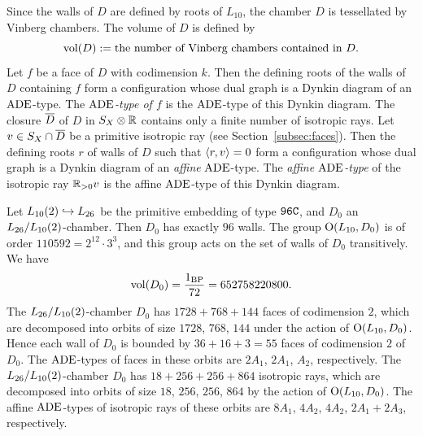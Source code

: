 \documentclass{amsart}
\numberwithin{procedure}{section}
\begin{document}
Since the walls of $D$ are defined by  roots of $L_{10}$, 
the chamber $D$ is tessellated by Vinberg chambers.
The volume of $D$ is defined by
\[
\mathord{\rm{vol}}(D):=\textrm{the number of Vinberg chambers contained in $D$}.
\]
Let $f$ be a face of $D$ with codimension $k$.
Then the defining roots of the walls of $D$ containing $f$
form a configuration whose dual graph is a Dynkin diagram
of an $\mathord{\rm ADE}$-type.
The \emph{$\mathord{\rm ADE}$-type of $f$} is the $\mathord{\rm ADE}$-type of this Dynkin diagram.
The closure $\overline{D}$ of $D$ in $S_{X}\otimes\mathord{\mathbb R}$ 
contains only a finite number of isotropic rays.
Let $v\in S_{X}\cap \overline{D}$ be a primitive isotropic ray (see Section~\ref{subsec:faces}).
Then the defining roots $r$ of walls of $D$
such that $\langle r, v \rangle=0$
form a configuration whose dual graph is a Dynkin diagram
of an \emph{affine} $\mathord{\rm ADE}$-type.
The \emph{affine $\mathord{\rm ADE}$-type} of the  isotropic ray $\mathord{\mathbb R}_{>0}v$ is
the affine $\mathord{\rm ADE}$-type of this Dynkin diagram.
%
\begin{example}\label{example:96C}
Let $L_{10}(2) \hookrightarrow L_{26}$ be the primitive embedding of type ${\tt 96C}$,
and  $D_0$  an $L_{26}/L_{10}(2)$-chamber.
Then $D_0$ has exactly $96$ walls.
The group $\mathord{\mathrm{O}}(L_{10}, D_0)$ is 
of order $110592=2^{12}\cdot 3^3$, and
this group acts on the set of walls of $D_0$ transitively.
We have
\[
\mathord{\rm{vol}}(D_0)=\frac{1_{\mathord{\rm{BP}}}}{72}=652758220800.
\]
The $L_{26}/L_{10}(2)$-chamber  $D_0$ has $1728+768+144$ faces of codimension $2$,
which are decomposed into orbits of size $1728$, $768$, $144$
under the action of $\mathord{\mathrm{O}}(L_{10}, D_0)$.
Hence each wall of $D_0$
is bounded by $36+16+3=55$ faces of codimension $2$ of $D_0$.
The $\mathord{\rm ADE}$-types of faces in these orbits are 
$2A_1$, $2A_1$, $A_2$, 
respectively.
The $L_{26}/L_{10}(2)$-chamber  $D_0$ has $18+256+256+864$  isotropic rays,
which are decomposed into orbits of size $18$, $256$, $256$, $864$
by the action of $\mathord{\mathrm{O}}(L_{10}, D_0)$.
The affine $\mathord{\rm ADE}$-types of  isotropic rays of these  orbits
are $8{A}_1$, $4{A}_2$,  $4{A}_2$,  $2{A}_1+2{A}_3$,
respectively.
\end{example}
%
\end{document}
